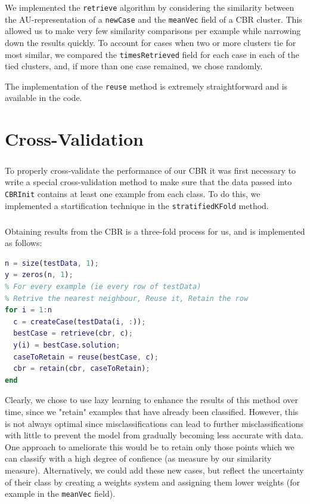 \documentclass[a4paper,12pt,oneside,final]{report}
\newenvironment{changemargin}[2]{\begin{list}{}{%
\setlength{\topsep}{0pt}%
\setlength{\leftmargin}{0pt}%
\setlength{\rightmargin}{0pt}%
\setlength{\listparindent}{\parindent}%
\setlength{\itemindent}{\parindent}%
\setlength{\parsep}{0pt plus 1pt}%
\addtolength{\leftmargin}{#1}%
\addtolength{\rightmargin}{#2}%
}\item }{\end{list}}
\begin{document}
We implemented the \verb+retrieve+ algorithm by considering the similarity between the AU-representation of a \verb+newCase+ and the \verb+meanVec+ field of a CBR cluster.  This allowed us to make very few similarity comparisons per example while narrowing down the results quickly.  To account for cases when two or more clusters tie for most similar, we compared the \verb+timesRetrieved+ field for each case in each of the tied clusters, and, if more than one case remained, we chose randomly.

The implementation of the \verb+reuse+ method is extremely straightforward and is available in the code.

\chapter{Cross-Validation}
\paragraph{}
To properly cross-validate the performance of our CBR it was first necessary to write a special cross-validation method to make sure that the data passed into \verb+CBRInit+ contains at least one example from each class.  To do this, we implemented a startification technique in the \verb+stratifiedKFold+ method.  

\paragraph{}
Obtaining results from the CBR is a three-fold process for us, and is implemented as follows:
\begin{changemargin}{-5mm}{-5mm}
\begin{lstlisting}[language=Matlab, frame=single]
n = size(testData, 1);
y = zeros(n, 1);
% For every example (ie every row of testData)
% Retrive the nearest neighbour, Reuse it, Retain the row    
for i = 1:n
  c = createCase(testData(i, :));
  bestCase = retrieve(cbr, c);
  y(i) = bestCase.solution;
  caseToRetain = reuse(bestCase, c);
  cbr = retain(cbr, caseToRetain);
end
\end{lstlisting}
\end{changemargin}
Clearly, we chose to use lazy learning to enhance the results of this method over time, since we "retain" examples that have already been classified.  However, this is not always optimal since misclassifications can lead to further misclassifications with little to prevent the model from gradually becoming less accurate with data.  One approach to ameliorate this would be to retain only those points which we can classify with a high degree of confience (as measure by our similarity measure).  Alternatively, we could add these new cases, but reflect the uncertainty of their class by creating a weights system and assigning them lower weights (for example in the \verb+meanVec+ field).
\end{document}
